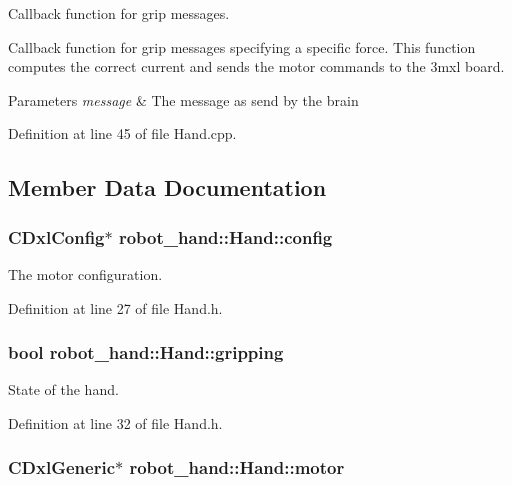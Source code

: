 Callback function for grip messages. 

Callback function for grip messages specifying a specific force. This function computes the correct current and sends the motor commands to the 3mxl board. 
\begin{DoxyParams}{Parameters}
{\em message} & The message as send by the brain \\
\hline
\end{DoxyParams}


Definition at line 45 of file Hand.\-cpp.



\subsection{Member Data Documentation}
\subsubsection[{config}]{\setlength{\rightskip}{0pt plus 5cm}C\-Dxl\-Config$\ast$ robot\-\_\-hand\-::\-Hand\-::config\hspace{0.3cm}{\ttfamily [protected]}}\label{classrobot__hand_1_1Hand_a106e1f5a0a121b805644af13d0fb2d4f}


The motor configuration. 



Definition at line 27 of file Hand.\-h.

\subsubsection[{gripping}]{\setlength{\rightskip}{0pt plus 5cm}bool robot\-\_\-hand\-::\-Hand\-::gripping\hspace{0.3cm}{\ttfamily [protected]}}\label{classrobot__hand_1_1Hand_a55e46010d1096fad640525e4588fdfc3}


State of the hand. 



Definition at line 32 of file Hand.\-h.

\subsubsection[{motor}]{\setlength{\rightskip}{0pt plus 5cm}C\-Dxl\-Generic$\ast$ robot\-\_\-hand\-::\-Hand\-::motor\hspace{0.3cm}{\ttfamily [protected]}}\label{classrobot__hand_1_1Hand_a5b6fe554354f8e85e49b6201ec3d5448}



